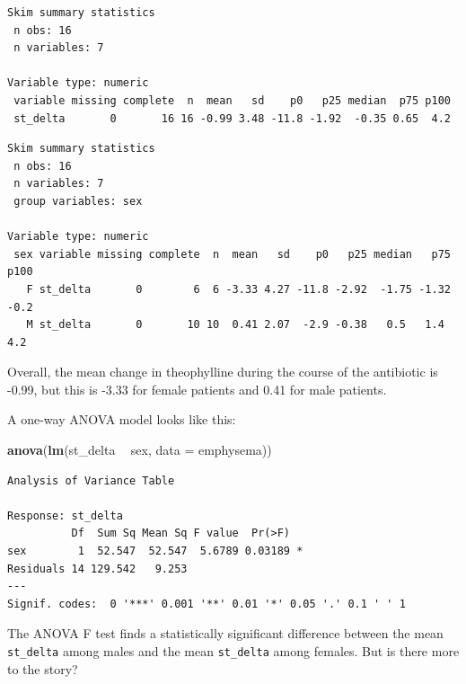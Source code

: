\documentclass[]{book}
\newenvironment{Shaded}{\begin{snugshade}}{\end{snugshade}}
\newcommand{\KeywordTok}[1]{\textcolor[rgb]{0.13,0.29,0.53}{\textbf{#1}}}
\newcommand{\DataTypeTok}[1]{\textcolor[rgb]{0.13,0.29,0.53}{#1}}
\newcommand{\StringTok}[1]{\textcolor[rgb]{0.31,0.60,0.02}{#1}}
\newcommand{\OperatorTok}[1]{\textcolor[rgb]{0.81,0.36,0.00}{\textbf{#1}}}
\newcommand{\NormalTok}[1]{#1}
\theoremstyle{definition}
\theoremstyle{definition}
\theoremstyle{definition}
\theoremstyle{remark}
\begin{document}
\begin{verbatim}
Skim summary statistics
 n obs: 16 
 n variables: 7 

Variable type: numeric 
 variable missing complete  n  mean   sd    p0   p25 median  p75 p100
 st_delta       0       16 16 -0.99 3.48 -11.8 -1.92  -0.35 0.65  4.2
\end{verbatim}

\begin{Shaded}
\end{Shaded}

\begin{verbatim}
Skim summary statistics
 n obs: 16 
 n variables: 7 
 group variables: sex 

Variable type: numeric 
 sex variable missing complete  n  mean   sd    p0   p25 median   p75 p100
   F st_delta       0        6  6 -3.33 4.27 -11.8 -2.92  -1.75 -1.32 -0.2
   M st_delta       0       10 10  0.41 2.07  -2.9 -0.38   0.5   1.4   4.2
\end{verbatim}

Overall, the mean change in theophylline during the course of the
antibiotic is -0.99, but this is -3.33 for female patients and 0.41 for
male patients.

A one-way ANOVA model looks like this:

\begin{Shaded}
\begin{Highlighting}[]
\KeywordTok{anova}\NormalTok{(}\KeywordTok{lm}\NormalTok{(st_delta }\OperatorTok{~}\StringTok{ }\NormalTok{sex, }\DataTypeTok{data =}\NormalTok{ emphysema))}
\end{Highlighting}
\end{Shaded}

\begin{verbatim}
Analysis of Variance Table

Response: st_delta
          Df  Sum Sq Mean Sq F value  Pr(>F)  
sex        1  52.547  52.547  5.6789 0.03189 *
Residuals 14 129.542   9.253                  
---
Signif. codes:  0 '***' 0.001 '**' 0.01 '*' 0.05 '.' 0.1 ' ' 1
\end{verbatim}

The ANOVA F test finds a statistically significant difference between
the mean \texttt{st\_delta} among males and the mean \texttt{st\_delta}
among females. But is there more to the story?
\end{document}
